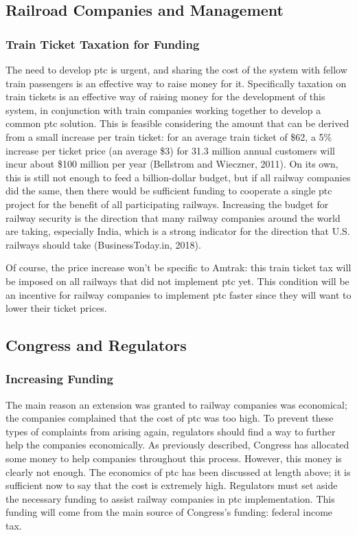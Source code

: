 \documentclass[11pt, titlepage]{article}
\begin{document}
\subsection{Railroad Companies and Management}

\subsubsection{Train Ticket Taxation for Funding}

The need to develop \gls{ptc} is urgent, and sharing the cost of the system with
fellow train passengers is an effective way to raise money for it. Specifically
taxation on train tickets is an effective way of raising money for the development
of this system, in conjunction with train companies working together to develop a
common \gls{ptc} solution. This is feasible considering the amount that can be
derived from a small increase per train ticket: for an average train ticket of \$62,
a 5\% increase per ticket price (an average \$3) for 31.3 million annual customers
will incur about \$100 million per year (Bellstrom and Wieczner, 2011).
On its own, this is still not enough to feed a billion-dollar budget, but if all
railway companies did the same, then there would be sufficient funding to cooperate
a single \gls{ptc} project for the benefit of all participating railways. Increasing
the budget for railway security is the direction that many railway companies around
the world are taking, especially India, which is a strong indicator for the direction
that U.S. railways should take (BusinessToday.in, 2018).

Of course, the price increase won’t be specific to Amtrak: this train ticket tax
will be imposed on all railways that did not implement \gls{ptc} yet. This condition
will be an incentive for railway companies to implement \gls{ptc} faster since they
will want to lower their ticket prices.

\subsection{Congress and Regulators}

\subsubsection{Increasing Funding}

The main reason an extension was granted to railway companies was economical; the
companies complained that the cost of \gls{ptc} was too high. To prevent these types
of complaints from arising again, regulators should find a way to further help the
companies economically. As previously described, Congress has allocated some money
to help companies throughout this process. However, this money is clearly not
enough. The economics of \gls{ptc} has been discussed at length above; it is
sufficient now to say that the cost is extremely high. Regulators must set aside the
necessary funding to assist railway companies in \gls{ptc} implementation. This
funding will come from the main source of Congress’s funding: federal income tax.
\end{document}
